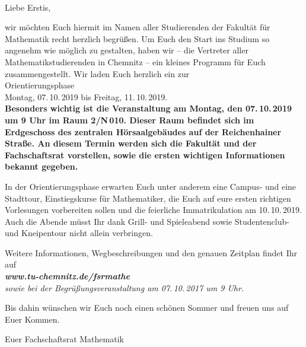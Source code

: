 \documentclass[nkz,einrichtung,usemycontact]{tucletter2019}
\begin{document}
	
\begin{letter}{%
\, \\
}

\opening{Liebe Erstis,}


wir möchten Euch hiermit im Namen aller Studierenden der Fakultät für Mathematik recht herzlich begrüßen.
Um Euch den Start ins Studium so angenehm wie möglich zu gestalten, haben wir -- die Vertreter aller Mathematikstudierenden in Chemnitz -- ein
kleines Programm für Euch zusammengestellt. Wir laden Euch herzlich ein zur \\[16pt]

\hspace*{\fill} \Large Orientierungsphase \hspace*{\fill} \\
\hspace*{\fill} Montag, 07.\,10.\,2019 bis Freitag, 11.\,10.\,2019. \normalsize \hspace*{\fill} \\[20pt]


\bfseries Besonders wichtig ist die Veranstaltung am Montag, den 07.\,10.\,2019 um 9 Uhr im Raum 2/N\,010. Dieser Raum befindet sich im Erdgeschoss 
des zentralen Hörsaalgebäudes auf der Reichenhainer Straße. An diesem Termin werden sich die Fakultät und der Fachschaftsrat vorstellen, sowie 
die ersten wichtigen Informationen bekannt gegeben.\mdseries

\medskip

In der Orientierungsphase erwarten Euch unter anderem eine Campus- und eine Stadttour, Einstiegskurse für Mathematiker, die Euch auf eure ersten richtigen Vorlesungen vorbereiten sollen und die feierliche Immatrikulation am 10.\,10.\,2019. Auch die Abende müsst Ihr dank Grill- und Spieleabend sowie Studentenclub- und Kneipentour nicht allein verbringen.

\medskip

Weitere Informationen, Wegbeschreibungen und den genauen Zeitplan findet Ihr auf\\[8pt]
\hspace*{\fill} \itshape\textbf{www.tu-chemnitz.de/fsrmathe} \upshape \hspace*{\fill} \\[8pt]
sowie bei der Begrüßungsveranstaltung am 07.\,10.\,2017 um 9 Uhr.

\bigskip

Bis dahin wünschen wir Euch noch einen schönen Sommer und freuen uns auf Euer Kommen.

\bigskip

Euer Fachschaftsrat Mathematik

\end{letter}
\end{document}
